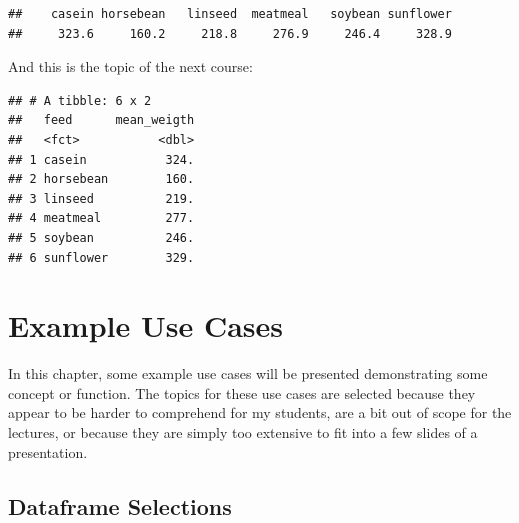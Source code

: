 \documentclass[]{book}
\newenvironment{Shaded}{\begin{snugshade}}{\end{snugshade}}
\newcommand{\ControlFlowTok}[1]{\textcolor[rgb]{0.13,0.29,0.53}{\textbf{#1}}}
\newcommand{\DataTypeTok}[1]{\textcolor[rgb]{0.13,0.29,0.53}{#1}}
\newcommand{\KeywordTok}[1]{\textcolor[rgb]{0.13,0.29,0.53}{\textbf{#1}}}
\newcommand{\NormalTok}[1]{#1}
\newcommand{\OperatorTok}[1]{\textcolor[rgb]{0.81,0.36,0.00}{\textbf{#1}}}
\newcommand{\StringTok}[1]{\textcolor[rgb]{0.31,0.60,0.02}{#1}}
\begin{document}
\begin{Shaded}
\end{Shaded}

\begin{verbatim}
##    casein horsebean   linseed  meatmeal   soybean sunflower 
##     323.6     160.2     218.8     276.9     246.4     328.9
\end{verbatim}

And this is the topic of the next course:

\begin{Shaded}
\end{Shaded}

\begin{verbatim}
## # A tibble: 6 x 2
##   feed      mean_weigth
##   <fct>           <dbl>
## 1 casein           324.
## 2 horsebean        160.
## 3 linseed          219.
## 4 meatmeal         277.
## 5 soybean          246.
## 6 sunflower        329.
\end{verbatim}

\hypertarget{usecases}{%
\section{Example Use Cases}\label{usecases}}

In this chapter, some example use cases will be presented demonstrating some concept or function.
The topics for these use cases are selected because they appear to be harder to comprehend for my students, are a bit out of scope for the lectures, or because they are simply too extensive to fit into a few slides of a presentation.

\hypertarget{dfselection}{%
\subsection{Dataframe Selections}\label{dfselection}}
\end{document}

